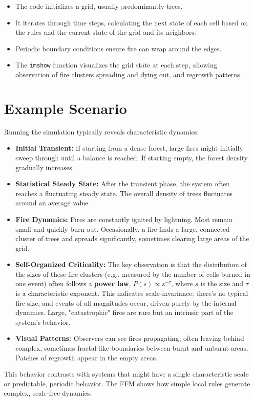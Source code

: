 \documentclass{article}
\begin{document}
\begin{itemize}
\item The code initializes a grid, usually predominantly trees.
\item It iterates through time steps, calculating the next state of each cell based on the rules and the current state of the grid and its neighbors.
\item Periodic boundary conditions ensure fire can wrap around the edges.
\item The \texttt{imshow} function visualizes the grid state at each step, allowing observation of fire clusters spreading and dying out, and regrowth patterns.
\end{itemize}

\section{Example Scenario }

Running the simulation typically reveals characteristic dynamics:
\begin{itemize}
\item \textbf{Initial Transient:} If starting from a dense forest, large fires might initially sweep through until a balance is reached. If starting empty, the forest density gradually increases.
\item \textbf{Statistical Steady State:} After the transient phase, the system often reaches a fluctuating steady state. The overall density of trees fluctuates around an average value.
\item \textbf{Fire Dynamics:} Fires are constantly ignited by lightning. Most remain small and quickly burn out. Occasionally, a fire finds a large, connected cluster of trees and spreads significantly, sometimes clearing large areas of the grid.
\item \textbf{Self-Organized Criticality:} The key observation is that the distribution of the sizes of these fire clusters (e.g., measured by the number of cells burned in one event) often follows a \textbf{power law}, $P(s) \propto s^{-\tau}$, where $s$ is the size and $\tau$ is a characteristic exponent. This indicates scale-invariance: there's no typical fire size, and events of all magnitudes occur, driven purely by the internal dynamics. Large, "catastrophic" fires are rare but an intrinsic part of the system's behavior.
\item \textbf{Visual Patterns:} Observers can see fires propagating, often leaving behind complex, sometimes fractal-like boundaries between burnt and unburnt areas. Patches of regrowth appear in the empty areas.
\end{itemize}
This behavior contrasts with systems that might have a single characteristic scale or predictable, periodic behavior. The FFM shows how simple local rules generate complex, scale-free dynamics.
\end{document}
